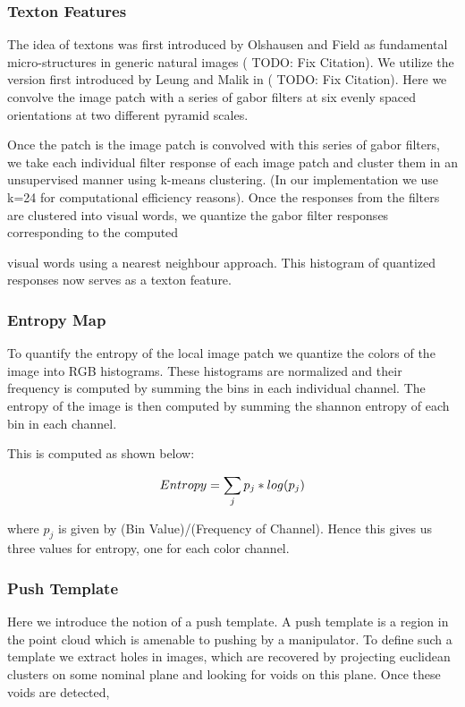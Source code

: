 \subsubsection{Texton Features}
The idea of textons was first introduced by Olshausen and Field as fundamental micro-structures in generic natural images (\cite{Javidi12_Journal} TODO: Fix Citation). We utilize the version first introduced by Leung and Malik in  (\cite{Javidi12_Journal} TODO: Fix Citation). Here we convolve the image patch with a series of gabor filters at six evenly spaced orientations at two different pyramid scales.

Once the patch is the image patch is convolved with this series of gabor filters, we take each individual filter response of each image patch and cluster them in an unsupervised manner using k-means clustering. (In our implementation we use k=24 for computational efficiency reasons). Once the responses from the filters are clustered into visual words, we quantize the gabor filter responses corresponding to the computed

visual words using a nearest neighbour approach. This histogram of quantized responses now serves as a texton feature.

\subsubsection{Entropy Map}
To quantify the entropy of the local image patch we quantize the colors of the image into RGB histograms. These histograms are normalized and their frequency is computed by summing the bins in each individual channel. The entropy of the image is then computed by summing the shannon entropy of each bin in each channel.

This is computed as shown below:

\[
Entropy = \sum_jp_j*log(p_j)\\
\]

where $p_j$ is given by (Bin Value)/(Frequency of Channel). Hence this gives us three values for entropy, one for each color channel.

\subsubsection{Push Template}
Here we introduce the notion of a push template. A push template is a region in the point cloud which is amenable to pushing by a manipulator. To define such a template we extract holes in images, which are recovered by projecting euclidean clusters on some nominal plane and looking for voids on this plane. Once these voids are detected,

